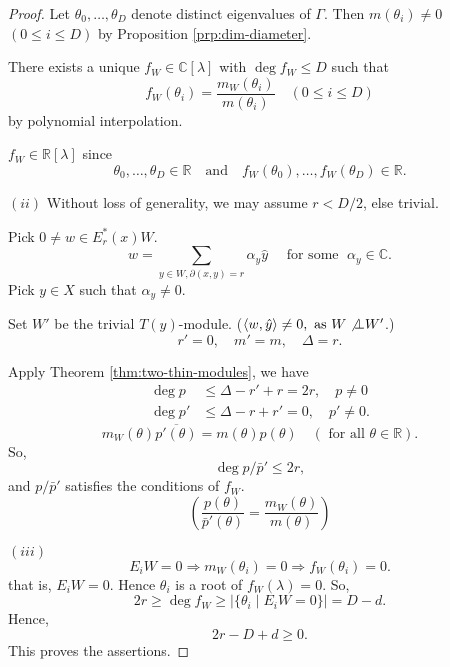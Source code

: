 \documentclass[
]{book}
\theoremstyle{definition}
\theoremstyle{definition}
\theoremstyle{definition}
\theoremstyle{definition}
\theoremstyle{remark}
\begin{document}
\begin{proof}
Let \(\theta_0, \ldots, \theta_D\) denote distinct eigenvalues of \(\Gamma\). Then \(m(\theta_i) \neq 0\) \((0\leq i\leq D)\) by Proposition \ref{prp:dim-diameter}.

There exists a unique \(f_W\in \mathbb{C}[\lambda]\) with \(\deg f_W\leq D\) such that
\[f_W(\theta_i) = \frac{m_W(\theta_i)}{m(\theta_i)} \quad (0\leq i\leq D)\]
by polynomial interpolation.

\(f_W\in \mathbb{R}[\lambda]\) since
\[\theta_0, \ldots, \theta_D\in \mathbb{R} \quad \text{and}\quad f_W(\theta_0), \ldots, f_W(\theta_D) \in \mathbb{R}.\]

\((ii)\) Without loss of generality, we may assume \(r < D/2\), else trivial.

Pick \(0\neq w \in E^*_r(x)W\).
\[w = \sum_{y\in W, \partial(x,y) = r}\alpha_y\hat{y} \quad \text{ for some } \; \alpha_y\in \mathbb{C}.\]
Pick \(y\in X\) such that \(\alpha_y\neq 0\).

Set \(W'\) be the trivial \(T(y)\)-module. (\(\langle w, \hat{y}\rangle \neq 0, \text{ as } W\not\bot W'\).)
\[r' = 0, \quad m' = m, \quad \Delta = r.\]

Apply Theorem \ref{thm:two-thin-modules}, we have
\begin{align}
\deg p & \leq \Delta - r' + r = 2r, \quad p\neq 0\\
\deg p' & \leq \Delta - r + r' = 0 , \quad p'\neq 0.
\end{align}
\[m_W(\theta)\overline{p'(\theta)} = m(\theta)p(\theta) \quad (\text{ for all } \theta \in \mathbb{R}).\]
So,
\[\deg p/\bar{p}' \leq 2r,\]
and \(p/\bar{p}'\) satisfies the conditions of \(f_W\).
\[\left(\frac{p(\theta)}{\bar{p}'(\theta)} = \frac{m_W(\theta)}{m(\theta)}\right)\]

\((iii)\)
\[E_iW = 0 \Rightarrow m_W(\theta_i) = 0 \Rightarrow f_W(\theta_i) = 0.\]
that is, \(E_iW = 0\). Hence \(\theta_i\) is a root of \(f_W(\lambda) = 0\).
So,
\[2r \geq \deg f_W \geq |\{\theta_i\mid E_iW = 0\}| = D-d.\]
Hence,
\[2r-D + d \geq 0.\]
This proves the assertions.
\end{proof}
\end{document}
